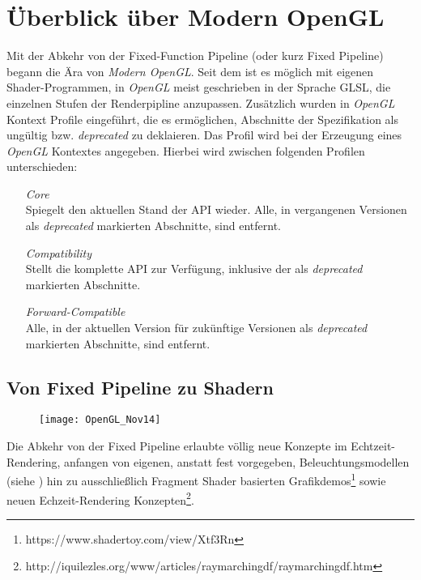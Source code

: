 \chapter{Überblick über Modern OpenGL}
\label{chap:modern-opengl}

Mit der Abkehr von der Fixed-Function Pipeline (oder kurz Fixed Pipeline) begann die Ära von \textit{Modern OpenGL}. Seit dem ist es möglich mit eigenen Shader-Programmen, in \textit{OpenGL} meist geschrieben in der Sprache GLSL, die einzelnen Stufen der Renderpipline anzupassen. Zusätzlich wurden in \textit{OpenGL} Kontext Profile eingeführt, die es ermöglichen, Abschnitte der Spezifikation als ungültig bzw. \textit{deprecated} zu deklaieren. Das Profil wird bei der Erzeugung eines \textit{OpenGL} Kontextes angegeben. Hierbei wird zwischen folgenden Profilen unterschieden:

\begin{enumerate}[leftmargin=3.5cm]
\item[\textit{Core}] \hfill \\
	Spiegelt den aktuellen Stand der \ac{API} wieder. Alle, in vergangenen Versionen als \textit{deprecated} markierten Abschnitte, sind entfernt.
\item[\textit{Compatibility}] \hfill \\
	Stellt die komplette \ac{API} zur Verfügung, inklusive der als \textit{deprecated} markierten Abschnitte. 
\item[\textit{Forward-Compatible}] \hfill \\
	Alle, in der aktuellen Version für zukünftige Versionen als \textit{deprecated} markierten Abschnitte, sind entfernt.
\end{enumerate}

\section{Von Fixed Pipeline zu Shadern}

\begin{wrapfigure}{r}{0.4\linewidth}
\begin{centering}
	\texttt{[image: OpenGL\_Nov14]}
\end{centering}
\end{wrapfigure}

Die Abkehr von der Fixed Pipeline erlaubte völlig neue Konzepte im Echtzeit-Rendering, anfangen von eigenen, anstatt fest vorgegeben, Beleuchtungsmodellen (siehe ) hin zu ausschließlich Fragment Shader basierten Grafikdemos\footnote{https://www.shadertoy.com/view/Xtf3Rn} sowie neuen Echzeit-Rendering Konzepten\footnote{http://iquilezles.org/www/articles/raymarchingdf/raymarchingdf.htm}.

